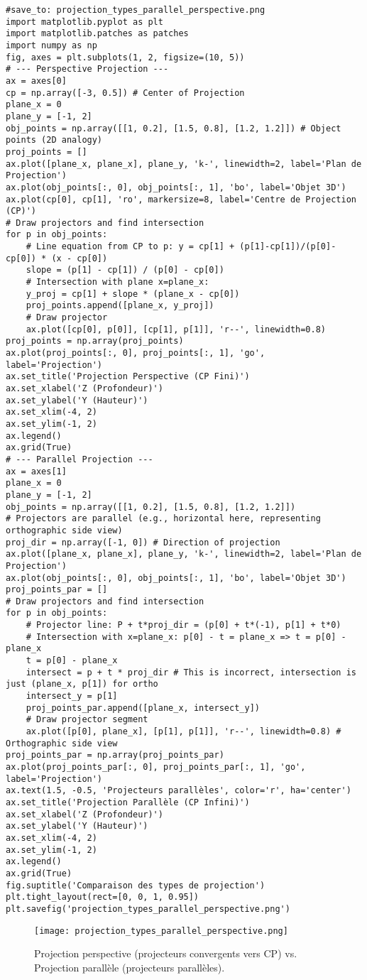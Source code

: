 \begin{verbatim}
#save_to: projection_types_parallel_perspective.png
import matplotlib.pyplot as plt
import matplotlib.patches as patches
import numpy as np
fig, axes = plt.subplots(1, 2, figsize=(10, 5))
# --- Perspective Projection ---
ax = axes[0]
cp = np.array([-3, 0.5]) # Center of Projection
plane_x = 0
plane_y = [-1, 2]
obj_points = np.array([[1, 0.2], [1.5, 0.8], [1.2, 1.2]]) # Object points (2D analogy)
proj_points = []
ax.plot([plane_x, plane_x], plane_y, 'k-', linewidth=2, label='Plan de Projection')
ax.plot(obj_points[:, 0], obj_points[:, 1], 'bo', label='Objet 3D')
ax.plot(cp[0], cp[1], 'ro', markersize=8, label='Centre de Projection (CP)')
# Draw projectors and find intersection
for p in obj_points:
    # Line equation from CP to p: y = cp[1] + (p[1]-cp[1])/(p[0]-cp[0]) * (x - cp[0])
    slope = (p[1] - cp[1]) / (p[0] - cp[0])
    # Intersection with plane x=plane_x:
    y_proj = cp[1] + slope * (plane_x - cp[0])
    proj_points.append([plane_x, y_proj])
    # Draw projector
    ax.plot([cp[0], p[0]], [cp[1], p[1]], 'r--', linewidth=0.8)
proj_points = np.array(proj_points)
ax.plot(proj_points[:, 0], proj_points[:, 1], 'go', label='Projection')
ax.set_title('Projection Perspective (CP Fini)')
ax.set_xlabel('Z (Profondeur)')
ax.set_ylabel('Y (Hauteur)')
ax.set_xlim(-4, 2)
ax.set_ylim(-1, 2)
ax.legend()
ax.grid(True)
# --- Parallel Projection ---
ax = axes[1]
plane_x = 0
plane_y = [-1, 2]
obj_points = np.array([[1, 0.2], [1.5, 0.8], [1.2, 1.2]])
# Projectors are parallel (e.g., horizontal here, representing orthographic side view)
proj_dir = np.array([-1, 0]) # Direction of projection
ax.plot([plane_x, plane_x], plane_y, 'k-', linewidth=2, label='Plan de Projection')
ax.plot(obj_points[:, 0], obj_points[:, 1], 'bo', label='Objet 3D')
proj_points_par = []
# Draw projectors and find intersection
for p in obj_points:
    # Projector line: P + t*proj_dir = (p[0] + t*(-1), p[1] + t*0)
    # Intersection with x=plane_x: p[0] - t = plane_x => t = p[0] - plane_x
    t = p[0] - plane_x
    intersect = p + t * proj_dir # This is incorrect, intersection is just (plane_x, p[1]) for ortho
    intersect_y = p[1]
    proj_points_par.append([plane_x, intersect_y])
    # Draw projector segment
    ax.plot([p[0], plane_x], [p[1], p[1]], 'r--', linewidth=0.8) # Orthographic side view
proj_points_par = np.array(proj_points_par)
ax.plot(proj_points_par[:, 0], proj_points_par[:, 1], 'go', label='Projection')
ax.text(1.5, -0.5, 'Projecteurs parallèles', color='r', ha='center')
ax.set_title('Projection Parallèle (CP Infini)')
ax.set_xlabel('Z (Profondeur)')
ax.set_ylabel('Y (Hauteur)')
ax.set_xlim(-4, 2)
ax.set_ylim(-1, 2)
ax.legend()
ax.grid(True)
fig.suptitle('Comparaison des types de projection')
plt.tight_layout(rect=[0, 0, 1, 0.95])
plt.savefig('projection_types_parallel_perspective.png')
\end{verbatim}
\begin{figure}[H]
\centering
\texttt{[image: projection\_types\_parallel\_perspective.png]}
\caption{Projection perspective (projecteurs convergents vers CP) vs. Projection parallèle (projecteurs parallèles).}
\label{fig:projection_types_parallel_perspective}
\end{figure}
